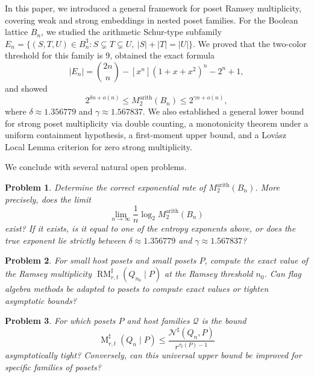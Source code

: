 \documentclass[twoside,12pt]{article}
\newtheorem{problem}{Problem}
\begin{document}
In this paper, we introduced a general framework for poset Ramsey multiplicity, covering weak and strong embeddings in nested poset families. For the Boolean lattice $B_n$, we studied the arithmetic Schur-type subfamily
$E_n=\{(S,T,U)\in B_n^3:S\subsetneq T\subsetneq U,\ |S|+|T|=|U|\}$.
We proved that the two-color threshold for this family is $9$, obtained the exact formula
\[
|E_n|=\binom{2n}{n}-[x^n](1+x+x^2)^n-2^n+1,
\]
and showed
\[
2^{\delta n+o(n)}
\leq M^{\mathrm{arith}}_2(B_n)
\leq 2^{\gamma n+o(n)},
\]
where \(\delta\approx 1.356779\) and \(\gamma\approx 1.567837\).
We also established a general lower bound for strong poset multiplicity via double counting, a monotonicity theorem under a uniform containment hypothesis, a first-moment upper bound, and a Lov\'asz Local Lemma criterion for zero strong multiplicity.

We conclude with several natural open problems.

\begin{problem}
Determine the correct exponential rate of \(M^{\mathrm{arith}}_2(B_n)\). More precisely, does the limit
\[
\lim_{n\to\infty}\frac1n\log_2 M^{\mathrm{arith}}_2(B_n)
\]
exist? If it exists, is it equal to one of the entropy exponents above, or does
the true exponent lie strictly between \(\delta\approx 1.356779\) and
\(\gamma\approx 1.567837\)?
\end{problem}


\begin{problem}
For small host posets and small posets $P$, compute the exact value of the Ramsey multiplicity $\operatorname{RM}_{r,t}^\sharp(Q_{n_0}\mid P)$ at the Ramsey threshold $n_0$. Can flag algebra methods be adapted to posets to compute exact values or tighten asymptotic bounds?
\end{problem}

\begin{problem}
For which posets $P$ and host families $\mathcal Q$ is the bound
\[
\operatorname M_{r,t}^\sharp(Q_n\mid P)\leq\frac{\mathcal N^\sharp(Q_n,P)}{r^{\tau_t(P)-1}}
\]
asymptotically tight? Conversely, can this universal upper bound be improved for specific families of posets?
\end{problem}
\end{document}
